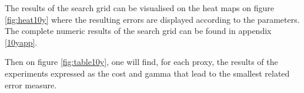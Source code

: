 \documentclass[11pt,a4paper,oneside]{book}
\begin{document}
The results of the search grid can be visualised on the heat maps on figure \ref{fig:heat10y} where the resulting errors are displayed according to the parameters. The complete numeric results of the search grid can be found in appendix \ref{10yapp}. 

Then on figure \ref{fig:table10y}, one will find, for each proxy, the results of the experiments expressed as the cost and gamma that lead to the smallest related error measure.


\begin{figure}[!h]
\centering
{}
\end{figure}
\end{document}
